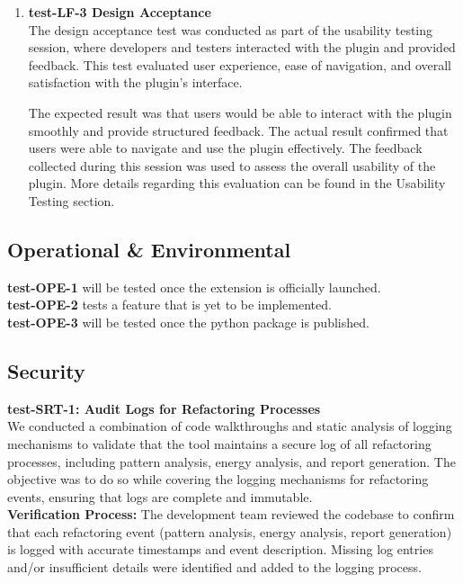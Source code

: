 \documentclass[12pt, titlepage]{article}
\begin{document}
\begin{enumerate}
  \item \textbf{test-LF-3 Design Acceptance} \\[2mm]
    The design acceptance test was conducted as part of the usability
    testing session, where developers and testers interacted with the
    plugin and provided feedback. This test evaluated user
    experience, ease of navigation, and overall satisfaction with the
    plugin's interface.

    The expected result was that users would be able to interact with
    the plugin smoothly and provide structured feedback. The actual
    result confirmed that users were able to navigate and use the
    plugin effectively. The feedback collected during this session
    was used to assess the overall usability of the plugin. More
    details regarding this evaluation can be found in the Usability
    Testing section.

\end{enumerate}

\subsection{Operational \& Environmental}

\textbf{test-OPE-1} will be tested once the extension is officially
launched.\\[2mm]

\noindent
\textbf{test-OPE-2} tests a feature that is yet to be implemented. \\[2mm]

\noindent
\textbf{test-OPE-3} will be tested once the python package is published.

\subsection{Security}

\textbf{test-SRT-1: Audit Logs for Refactoring Processes} \\[2mm]
We conducted a combination of code walkthroughs and static analysis
of logging mechanisms to validate that the tool maintains a secure
log of all refactoring processes, including pattern analysis, energy
analysis, and report generation. The objective was to do so while
covering the logging mechanisms for refactoring events, ensuring that
logs are complete and immutable.\\

\noindent \textbf{Verification Process:} The development team reviewed the codebase to confirm that
each refactoring event (pattern analysis, energy analysis, report
generation) is logged with accurate timestamps and event description.
Missing log entries and/or insufficient details were identified and
added to the logging process.\\
\end{document}
